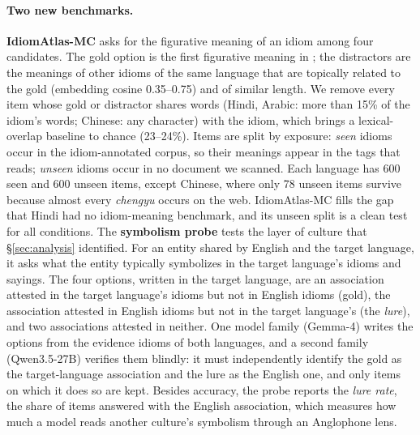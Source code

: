 \paragraph{Two new benchmarks.}
\label{sec:exp-probes}
\textbf{IdiomAtlas-MC} asks for the figurative meaning of an idiom among four candidates. The gold option is the first figurative meaning in \dataname{}; the distractors are the meanings of other idioms of the same language that are topically related to the gold (embedding cosine 0.35--0.75) and of similar length. We remove every item whose gold or distractor shares words (Hindi, Arabic: more than 15\% of the idiom's words; Chinese: any character) with the idiom, which brings a lexical-overlap baseline to chance (23--24\%). Items are split by exposure: \textit{seen} idioms occur in the idiom-annotated corpus, so their meanings appear in the tags that \idiomcpt{} reads; \textit{unseen} idioms occur in no document we scanned. Each language has 600 seen and 600 unseen items, except Chinese, where only 78 unseen items survive because almost every \textit{chengyu} occurs on the web. IdiomAtlas-MC fills the gap that Hindi had no idiom-meaning benchmark, and its unseen split is a clean test for all conditions.
The \textbf{symbolism probe} tests the layer of culture that \S\ref{sec:analysis} identified. For an entity shared by English and the target language, it asks what the entity typically symbolizes in the target language's idioms and sayings. The four options, written in the target language, are an association attested in the target language's idioms but not in English idioms (gold), the association attested in English idioms but not in the target language's (the \textit{lure}), and two associations attested in neither. One model family (Gemma-4) writes the options from the evidence idioms of both languages, and a second family (Qwen3.5-27B) verifies them blindly: it must independently identify the gold as the target-language association and the lure as the English one, and only items on which it does so are kept. Besides accuracy, the probe reports the \textit{lure rate}, the share of items answered with the English association, which measures how much a model reads another culture's symbolism through an Anglophone lens.
